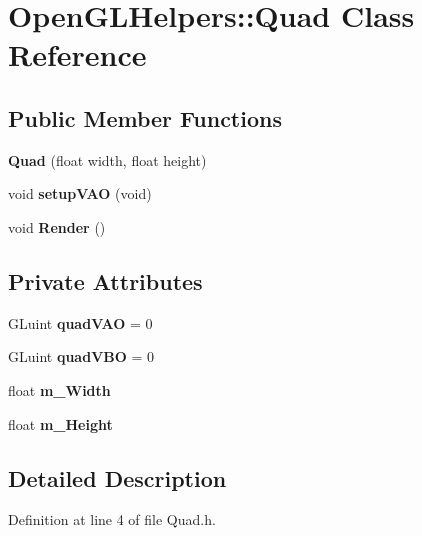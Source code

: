 \hypertarget{class_open_g_l_helpers_1_1_quad}{}\section{Open\+G\+L\+Helpers\+:\+:Quad Class Reference}
\label{class_open_g_l_helpers_1_1_quad}
\subsection*{Public Member Functions}
\begin{DoxyCompactItemize}
\item 
{\bfseries Quad} (float width, float height)\hypertarget{class_open_g_l_helpers_1_1_quad_a52d22730cab64feac7b38e572f2184c0}{}\label{class_open_g_l_helpers_1_1_quad_a52d22730cab64feac7b38e572f2184c0}

\item 
void {\bfseries setup\+V\+AO} (void)\hypertarget{class_open_g_l_helpers_1_1_quad_a20b101e1490c895aecdae310610562e2}{}\label{class_open_g_l_helpers_1_1_quad_a20b101e1490c895aecdae310610562e2}

\item 
void {\bfseries Render} ()\hypertarget{class_open_g_l_helpers_1_1_quad_a00634f4c68c5c4b301e4298c61a3352a}{}\label{class_open_g_l_helpers_1_1_quad_a00634f4c68c5c4b301e4298c61a3352a}

\end{DoxyCompactItemize}
\subsection*{Private Attributes}
\begin{DoxyCompactItemize}
\item 
G\+Luint {\bfseries quad\+V\+AO} = 0\hypertarget{class_open_g_l_helpers_1_1_quad_a2d9a7a43fb8b7d611f97a07ed179177d}{}\label{class_open_g_l_helpers_1_1_quad_a2d9a7a43fb8b7d611f97a07ed179177d}

\item 
G\+Luint {\bfseries quad\+V\+BO} = 0\hypertarget{class_open_g_l_helpers_1_1_quad_aa2a9ed90c9aa2e8e07ce260927f0226c}{}\label{class_open_g_l_helpers_1_1_quad_aa2a9ed90c9aa2e8e07ce260927f0226c}

\item 
float {\bfseries m\+\_\+\+Width}\hypertarget{class_open_g_l_helpers_1_1_quad_ac5e535bbfe2f97e822c333ba1bb7ad56}{}\label{class_open_g_l_helpers_1_1_quad_ac5e535bbfe2f97e822c333ba1bb7ad56}

\item 
float {\bfseries m\+\_\+\+Height}\hypertarget{class_open_g_l_helpers_1_1_quad_a1d8578d1b2a06ba778e0cb0888d9043e}{}\label{class_open_g_l_helpers_1_1_quad_a1d8578d1b2a06ba778e0cb0888d9043e}

\end{DoxyCompactItemize}


\subsection{Detailed Description}


Definition at line 4 of file Quad.\+h.

